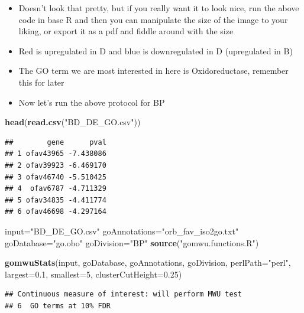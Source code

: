 \documentclass[
]{article}
\newenvironment{Shaded}{\begin{snugshade}}{\end{snugshade}}
\newcommand{\DataTypeTok}[1]{\textcolor[rgb]{0.13,0.29,0.53}{#1}}
\newcommand{\DecValTok}[1]{\textcolor[rgb]{0.00,0.00,0.81}{#1}}
\newcommand{\FloatTok}[1]{\textcolor[rgb]{0.00,0.00,0.81}{#1}}
\newcommand{\KeywordTok}[1]{\textcolor[rgb]{0.13,0.29,0.53}{\textbf{#1}}}
\newcommand{\NormalTok}[1]{#1}
\newcommand{\StringTok}[1]{\textcolor[rgb]{0.31,0.60,0.02}{#1}}
\begin{document}
\begin{itemize}
\item
  Doesn't look that pretty, but if you really want it to look nice, run
  the above code in base R and then you can manipulate the size of the
  image to your liking, or export it as a pdf and fiddle around with the
  size
\item
  Red is upregulated in D and blue is downregulated in D (upregulated in
  B)
\item
  The GO term we are most interested in here is Oxidoreductase, remember
  this for later
\item
  Now let's run the above protocol for BP
\end{itemize}

\begin{Shaded}
\begin{Highlighting}[]
\KeywordTok{head}\NormalTok{(}\KeywordTok{read.csv}\NormalTok{(}\StringTok{"BD_DE_GO.csv"}\NormalTok{))}
\end{Highlighting}
\end{Shaded}

\begin{verbatim}
##        gene      pval
## 1 ofav43965 -7.438086
## 2 ofav39923 -6.469170
## 3 ofav46740 -5.510425
## 4  ofav6787 -4.711329
## 5 ofav34835 -4.411774
## 6 ofav46698 -4.297164
\end{verbatim}

\begin{Shaded}
\begin{Highlighting}[]
\NormalTok{input=}\StringTok{"BD_DE_GO.csv"}
\NormalTok{goAnnotations=}\StringTok{"orb_fav_iso2go.txt"}
\NormalTok{goDatabase=}\StringTok{"go.obo"}
\NormalTok{goDivision=}\StringTok{"BP"}
\KeywordTok{source}\NormalTok{(}\StringTok{"gomwu.functions.R"}\NormalTok{)}

\KeywordTok{gomwuStats}\NormalTok{(input, goDatabase, goAnnotations, goDivision,}
           \DataTypeTok{perlPath=}\StringTok{"perl"}\NormalTok{,}
           \DataTypeTok{largest=}\FloatTok{0.1}\NormalTok{,}
           \DataTypeTok{smallest=}\DecValTok{5}\NormalTok{,}
           \DataTypeTok{clusterCutHeight=}\FloatTok{0.25}\NormalTok{)}
\end{Highlighting}
\end{Shaded}

\begin{verbatim}
## Continuous measure of interest: will perform MWU test
## 6  GO terms at 10% FDR
\end{verbatim}
\end{document}
